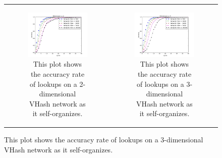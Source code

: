 \documentclass[11pt, conference, letterpaper]{IEEEtran}
\begin{document}
\begin{figure}
	\centering 
	\begin{tabular}{cc}
		
		\begin{subfigure}{\columnwidth}
			\includegraphics[width=\columnwidth]{conv_d2}
			\caption{This plot shows the accuracy rate of lookups on a 2-dimensional VHash network as it self-organizes.}
			\label{conv2}
		\end{subfigure} &
		
		\begin{subfigure}{\columnwidth}
			\includegraphics[width=\columnwidth]{conv_d3}
			\caption{This plot shows the accuracy rate of lookups on a 3-dimensional VHash network as it self-organizes.}
			\label{conv3}
		\end{subfigure} \\
		

\end{tabular}
\end{figure}
\end{document}
